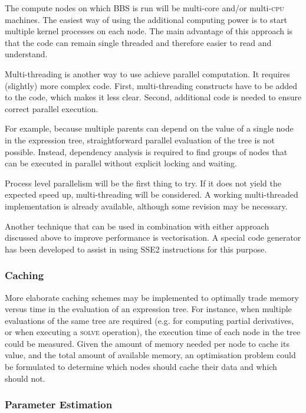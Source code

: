 \documentclass[10pt]{lofar}
\newcommand{\bbs}{BBS\xspace}
\newcommand{\solve}{\textsc{solve}\xspace}
\begin{document}
The compute nodes on which \bbs is run will be multi-core and/or
multi-\textsc{cpu} machines. The easiest way of using the additional computing
power is to start multiple kernel processes on each node. The main advantage of
this approach is that the code can remain single threaded and therefore easier
to read and understand.

Multi-threading is another way to use achieve parallel computation. It requires
(slightly) more complex code. First, multi-threading constructs have to be added
to the code, which makes it less clear. Second, additional code is needed to
ensure correct parallel execution.

For example, because multiple parents can depend on the value of a single node
in the expression tree, straightforward parallel evaluation of the tree is not
possible. Instead, dependency analysis is required to find groups of nodes that
can be executed in parallel without explicit locking and waiting.

Process level parallelism will be the first thing to try. If it does not yield
the expected speed up, multi-threading will be considered. A working
multi-threaded implementation is already available, although some revision may
be necessary.

Another technique that can be used in combination with either approach discussed
above to improve performance is vectorisation. A special code generator has been
developed to assist in using SSE2 instructions for this purpose.

\subsubsection{Caching}
\label{subsubsec:performance-caching}

More elaborate caching schemes may be implemented to optimally trade memory
versus time in the evaluation of an expression tree. For instance, when multiple
evaluations of the same tree are required (e.g. for computing partial
derivatives, or when executing a \solve operation), the execution time of each
node in the tree could be measured. Given the amount of memory needed per node
to cache its value, and the total amount of available memory, an optimisation
problem could be formulated to determine which nodes should cache their data and
which should not. 

\subsubsection{Parameter Estimation}
\label{subsubsec:performance-parameter-estimation}
\end{document}
